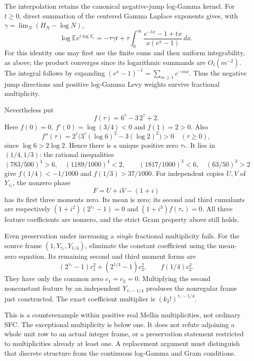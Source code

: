 \documentclass[11pt]{article}
\begin{document}
The interpolation retains the canonical negative-jump log-Gamma kernel.
For $t\ge0$, direct summation of the centered Gamma Laplace exponents
gives, with $\gamma=\lim_N(H_N-\log N)$,
\[
 \log\mathbb E e^{t\log Y_\tau}
 =-\tau\gamma t+
   \tau\int_0^\infty
       \frac{e^{-tx}-1+tx}{x(e^x-1)}\,dx.                \tag{16}
\]
For this identity one may first use the finite sums and then uniform
integrability, as above; the product converges since its logarithmic
summands are $O_t(m^{-2})$. The integral follows by expanding
$(e^x-1)^{-1}=\sum_{m\ge1}e^{-mx}$. Thus the negative jump directions
and positive log-Gamma Levy weights survive fractional multiplicity.

Nevertheless put
\[
 f(\tau)=6^\tau-3\,2^\tau+2.
\]
Here $f(0)=0$, $f'(0)=\log(3/4)<0$ and $f(1)=2>0$.
Also
\[
 f''(\tau)=2^\tau\bigl(3^\tau(\log6)^2-3(\log2)^2\bigr)>0
 \quad(\tau\ge0),
\]
since $\log6>2\log2$. Hence there is a unique positive zero
$\tau_*$. It lies in $(1/4,1/3)$: the rational inequalities
\[
 (783/500)^4>6,\quad(1189/1000)^4<2,\qquad
 (1817/1000)^3<6,\quad(63/50)^3>2
\]
give $f(1/4)<-1/1000$ and $f(1/3)>37/1000$.
For independent copies $U,V$ of $Y_{\tau_*}$, the nonzero phase
\[
                        F=U+iV-(1+i)
\]
has its first three moments zero. Its mean is zero; its second and
third cumulants are respectively
$(1+i^2)(2^{\tau_*}-1)=0$ and $(1+i^3)f(\tau_*)=0$.
All three feature coefficients are nonzero, and the strict Gram
property above still holds.

Even preservation under increasing a \emph{single} fractional
multiplicity fails. For the source frame
$(1,Y_{\tau_*},Y_{1/4})$, eliminate the constant coefficient using the
mean-zero equation. Its remaining second and third moment forms are
\[
 (2^{\tau_*}-1)c_1^2+(2^{1/4}-1)c_2^2,\qquad
                         f(1/4)c_2^3.
\]
They have only the common zero $c_1=c_2=0$.
Multiplying the second nonconstant feature by an independent
$Y_{\tau_*-1/4}$ produces the nonregular frame just constructed.
The exact coefficient multiplier is $(k_2!)^{\tau_*-1/4}$.

This is a counterexample within positive real Mellin multiplicities,
not ordinary SFC. The exceptional multiplicity is below one.
It does not refute adjoining a whole unit row to an actual integer
frame, or a preservation statement restricted to multiplicities
already at least one. A replacement argument must distinguish that
discrete structure from the continuous log-Gamma and Gram conditions.
\end{document}
